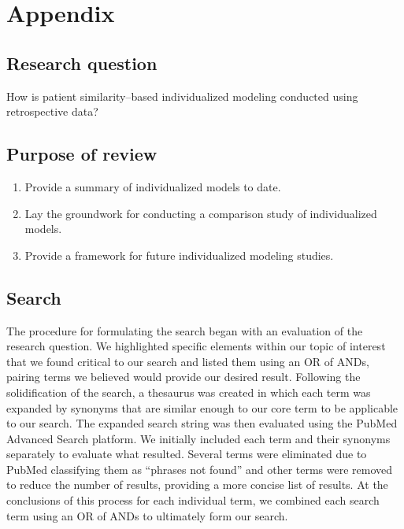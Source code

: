 \documentclass[preprint, 3p,
authoryear]{elsarticle} %
\providecommand{\tightlist}{%
  \setlength{\itemsep}{0pt}\setlength{\parskip}{0pt}}
\begin{document}
\hypertarget{appendix}{%
\section{Appendix}\label{appendix}}

\hypertarget{research-question}{%
\subsection{Research question}\label{research-question}}

How is patient similarity--based individualized modeling conducted using
retrospective data?

\hypertarget{purpose-of-review}{%
\subsection{Purpose of review}\label{purpose-of-review}}

\label{sec:appendix-purpose}

\begin{enumerate}
\def\labelenumi{\arabic{enumi}.}
\tightlist
\item
  Provide a summary of individualized models to date.
\item
  Lay the groundwork for conducting a comparison study of individualized
  models.
\item
  Provide a framework for future individualized modeling studies.
\end{enumerate}

\hypertarget{search-1}{%
\subsection{Search}\label{search-1}}

\label{sec:appendix-search}

The procedure for formulating the search began with an evaluation of the
research question. We highlighted specific elements within our topic of
interest that we found critical to our search and listed them using an
OR of ANDs, pairing terms we believed would provide our desired result.
Following the solidification of the search, a thesaurus was created in
which each term was expanded by synonyms that are similar enough to our
core term to be applicable to our search. The expanded search string was
then evaluated using the PubMed Advanced Search platform. We initially
included each term and their synonyms separately to evaluate what
resulted. Several terms were eliminated due to PubMed classifying them
as ``phrases not found'' and other terms were removed to reduce the
number of results, providing a more concise list of results. At the
conclusions of this process for each individual term, we combined each
search term using an OR of ANDs to ultimately form our search.
\end{document}
